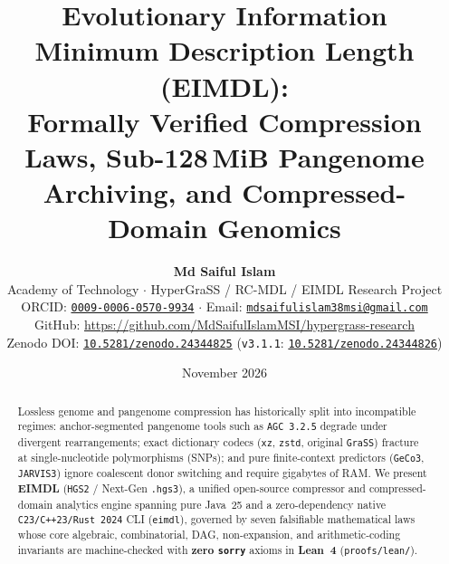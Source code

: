 \documentclass[10pt]{article}
\title{\textbf{Evolutionary Information Minimum Description Length (EIMDL):\\
Formally Verified Compression Laws, Sub-128\,MiB Pangenome\\
Archiving, and Compressed-Domain Genomics}}
\author{
  \textbf{Md Saiful Islam}\\
  Academy of Technology $\cdot$ HyperGraSS / RC-MDL / EIMDL Research Project\\
  {\small ORCID: \href{https://orcid.org/0009-0006-0570-9934}{\texttt{0009-0006-0570-9934}} $\cdot$ Email: \href{mailto:mdsaifulislam38msi@gmail.com}{\texttt{mdsaifulislam38msi@gmail.com}}}\\
  {\small GitHub: \url{https://github.com/MdSaifulIslamMSI/hypergrass-research}}\\
  {\small Zenodo DOI: \href{https://doi.org/10.5281/zenodo.24344825}{\texttt{10.5281/zenodo.24344825}} (\texttt{v3.1.1}: \href{https://doi.org/10.5281/zenodo.24344826}{\texttt{10.5281/zenodo.24344826}})}
}
\date{November 2026}
\begin{document}
\maketitle

\begin{abstract}
\noindent
Lossless genome and pangenome compression has historically split into incompatible regimes: anchor-segmented pangenome tools such as \texttt{AGC~3.2.5} degrade under divergent rearrangements; exact dictionary codecs (\texttt{xz}, \texttt{zstd}, original \texttt{GraSS}) fracture at single-nucleotide polymorphisms (SNPs); and pure finite-context predictors (\texttt{GeCo3}, \texttt{JARVIS3}) ignore coalescent donor switching and require gigabytes of RAM\@. We present \textbf{EIMDL} (\texttt{HGS2} / Next-Gen \texttt{.hgs3}), a unified open-source compressor and compressed-domain analytics engine spanning pure Java~25 and a zero-dependency native \texttt{C23/C++23/Rust~2024} CLI (\texttt{eimdl}), governed by seven falsifiable mathematical laws whose core algebraic, combinatorial, DAG, non-expansion, and arithmetic-coding invariants are machine-checked with \textbf{zero \texttt{sorry}} axioms in \textbf{Lean~4} (\texttt{proofs/lean/}).


\end{abstract}
\end{document}
